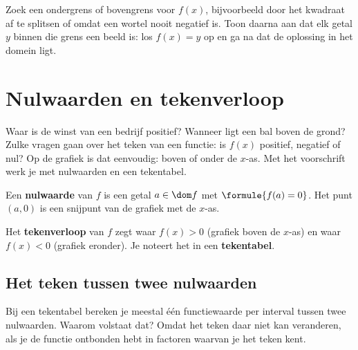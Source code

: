 \begin{werkwijze}
Zoek een ondergrens of bovengrens voor $f(x)$, bijvoorbeeld door het kwadraat af te splitsen of omdat een wortel nooit negatief is. Toon daarna aan dat elk getal $y$ binnen die grens een beeld is: los $f(x) = y$ op en ga na dat de oplossing in het domein ligt.
\end{werkwijze}

\begin{oefeningen}
\end{oefeningen}

\section{Nulwaarden en tekenverloop}

Waar is de winst van een bedrijf positief? Wanneer ligt een bal boven de grond? Zulke vragen gaan over het teken van een functie: is $f(x)$ positief, negatief of nul? Op de grafiek is dat eenvoudig: boven of onder de $x$-as. Met het voorschrift werk je met nulwaarden en een tekentabel.

\begin{theorie}
Een \textbf{\textcolor{accent}{nulwaarde}} van $f$ is een getal $a \in \dom f$ met $\formule{f(a) = 0}$. Het punt $(a, 0)$ is een snijpunt van de grafiek met de $x$-as.

Het \textbf{\textcolor{accent}{tekenverloop}} van $f$ zegt waar $f(x) > 0$ (grafiek boven de $x$-as) en waar $f(x) < 0$ (grafiek eronder). Je noteert het in een \textbf{\textcolor{accent}{tekentabel}}.
\end{theorie}

\subsection{Het teken tussen twee nulwaarden}

Bij een tekentabel bereken je meestal één functiewaarde per interval tussen twee nulwaarden. Waarom volstaat dat? Omdat het teken daar niet kan veranderen, als je de functie ontbonden hebt in factoren waarvan je het teken kent.

